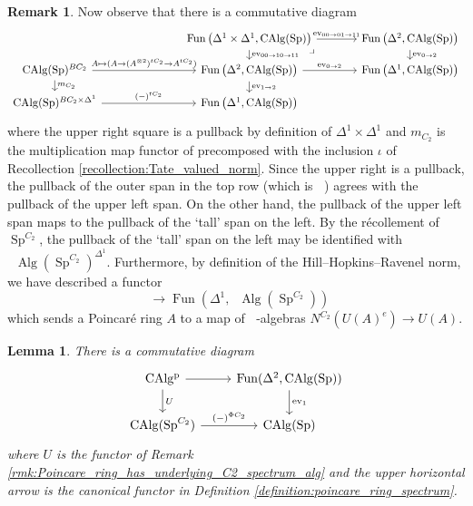 \documentclass{article}
\DeclareMathOperator{\Alg}{Alg} %
\DeclareMathOperator{\CAlg}{CAlg} %
\DeclareMathOperator{\CAlgp}{CAlg^p} %
\DeclareMathOperator{\Einfty}{\mathbf{E}_\infty} %
\DeclareMathOperator{\Fun}{Fun} %
\DeclareMathOperator{\Spectra}{Sp} %
\newtheorem{lemma}[equation]{Lemma}
\theoremstyle{definition}
\newtheorem{remark}[equation]{Remark}
\newcommand{\Lucy}[1]{\todo[color=cyan!30]{\linespread{1}\footnotesize L: #1}}
\begin{document}
\begin{remark}
    Now observe that there is a commutative diagram
    \begin{equation}\label{diagram:Poincare_ring_alternate_diagram}
    \begin{tikzcd}[column sep=large,row sep=small]
        && \Fun\left(\Delta^1 \times \Delta^1,\CAlg(\Spectra) \right) \ar[r,"{\mathrm{ev}_{00 \to 01 \to 11}}"] \ar[d,"{\mathrm{ev}_{00 \to 10 \to 11}}"] \ar[rd,phantom,"\lrcorner",very near start] & \Fun\left(\Delta^2, \CAlg(\Spectra)\right) \ar[d,"{\mathrm{ev}_{0\to 2}}"] \\
        \CAlg(\Spectra)^{BC_2} \ar[d,"{m_{C_2}}"] \ar[rr,"{A \mapsto (A \to (A^{\otimes 2})^{tC_2} \to A^{tC_2})}"] & &\Fun\left(\Delta^2,\CAlg(\Spectra) \right) \ar[r,"{\mathrm{ev}_{0 \to 2}}"] \ar[d,"{\mathrm{ev}_{1\to 2}}"] & \Fun\left(\Delta^1,\CAlg(\Spectra) \right) \\
        \CAlg(\Spectra)^{BC_2 \times \Delta^1} \ar[rr,"{(-)^{tC_2}}"] && \Fun\left(\Delta^1 ,\CAlg(\Spectra) \right) &
    \end{tikzcd}
    \end{equation}
    where the upper right square is a pullback by definition of $ \Delta^1 \times \Delta^1 $ and $ m_{C_2} $ is the multiplication map functor of \cite[Construction 3.1]{LYang_normedrings} precomposed with the inclusion $ \iota $ of Recollection \ref{recollection:Tate_valued_norm}. 
    Since the upper right is a pullback, the pullback of the outer span in the top row (which is $ \CAlgp $) agrees with the pullback of the upper left span. 
    On the other hand, the pullback of the upper left span maps to the pullback of the `tall' span on the left. 
    By the récollement of $ \Spectra^{C_2} $, the pullback of the `tall' span on the left may be identified with $ \Einfty \Alg\left(\Spectra^{C_2}\right)^{\Delta^1} $. 
    Furthermore, by definition of the Hill--Hopkins--Ravenel norm, we have described a functor
    \begin{equation}\label{eq:Poincare_ring_functorial_norm}
        \CAlgp \to \Fun\left(\Delta^1,\Einfty \Alg\left(\Spectra^{C_2}\right)\right)
    \end{equation}
    which sends a Poincaré ring $ A $ to a map of $ \Einfty $-algebras $ N^{C_2}(U(A)^e) \to U(A) $. 
\end{remark}
\begin{lemma}\label{lemma:Poincare_ring_geom_fixpt}
    There is a commutative diagram
    \begin{equation*}
    \begin{tikzcd}
        \CAlgp \ar[r] \ar[d,"U"] & \operatorname{Fun}(\Delta^2,\CAlg(\Spectra)) \ar[d,"{\mathrm{ev}_1}"] \\
        \CAlg(\Spectra^{C_2}) \ar[r,"{(-)^{\Phi C_2}}"] & \CAlg(\Spectra)
    \end{tikzcd}
    \end{equation*}
    where $ U $ is the functor of Remark \ref{rmk:Poincare_ring_has_underlying_C2_spectrum_alg} and the upper horizontal arrow is the canonical functor in Definition \ref{definition:poincare_ring_spectrum}. %
\end{lemma}
\end{document}
